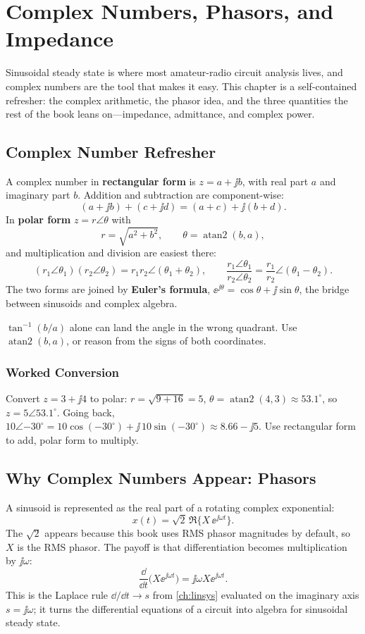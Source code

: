 \chapter{Complex Numbers, Phasors, and Impedance}
\label{ch:complex}
Sinusoidal steady state is where most amateur-radio circuit analysis lives, and
complex numbers are the tool that makes it easy. This chapter is a self-contained
refresher: the complex arithmetic, the phasor idea, and the three quantities the
rest of the book leans on---impedance, admittance, and complex power.

\section{Complex Number Refresher}
A complex number in \textbf{rectangular form} is \(z=a+\jj b\), with real part
\(a\) and imaginary part \(b\). Addition and subtraction are component-wise:
\[
(a+\jj b)+(c+\jj d)=(a+c)+\jj(b+d).
\]
In \textbf{polar form} \(z=r\angle\theta\) with
\[
r=\sqrt{a^2+b^2},\qquad \theta=\operatorname{atan2}(b,a),
\]
and multiplication and division are easiest there:
\[
(r_1\angle\theta_1)(r_2\angle\theta_2)=r_1r_2\angle(\theta_1+\theta_2),
\qquad
\frac{r_1\angle\theta_1}{r_2\angle\theta_2}=\frac{r_1}{r_2}\angle(\theta_1-\theta_2).
\]
The two forms are joined by \textbf{Euler's formula},
\(\ee^{\jj\theta}=\cos\theta+\jj\sin\theta\), the bridge between sinusoids and
complex algebra.

\begin{mistakebox}
\(\tan^{-1}(b/a)\) alone can land the angle in the wrong quadrant. Use
\(\operatorname{atan2}(b,a)\), or reason from the signs of both coordinates.
\end{mistakebox}

\subsection{Worked Conversion}
Convert \(z=3+\jj4\) to polar: \(r=\sqrt{9+16}=5\),
\(\theta=\operatorname{atan2}(4,3)\approx53.1^\circ\), so \(z=5\angle53.1^\circ\).
Going back, \(10\angle{-30^\circ}=10\cos(-30^\circ)+\jj\,10\sin(-30^\circ)
\approx 8.66-\jj5\). Use rectangular form to add, polar form to multiply.

\section{Why Complex Numbers Appear: Phasors}
A sinusoid is represented as the real part of a rotating complex exponential:
\[
x(t)=\sqrt{2}\,\Re\{X\,\ee^{\jj\omega t}\}.
\]
The \(\sqrt{2}\) appears because this book uses RMS phasor magnitudes by default,
so \(X\) is the RMS phasor. The payoff is that differentiation becomes
multiplication by \(\jj\omega\):
\[
\frac{\dd}{\dd t}\bigl(X\ee^{\jj\omega t}\bigr)=\jj\omega X\ee^{\jj\omega t}.
\]
This is the Laplace rule \(\dd/\dd t\to s\) from \cref{ch:linsys} evaluated on the
imaginary axis \(s=\jj\omega\); it turns the differential equations of a circuit
into algebra for sinusoidal steady state.

